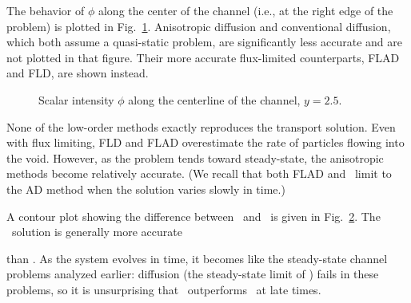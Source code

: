 The behavior of $\phi$ along the center of the channel (i.e., at the
right edge of the problem) is plotted in Fig.~\ref{fig:tdReactor}. Anisotropic
diffusion and conventional diffusion, which both assume a quasi-static problem,
are significantly less accurate and are not plotted in that figure. Their
more accurate flux-limited counterparts, FLAD and FLD, are shown instead.

\begin{figure}[htb]
  \centering\small
  \subfloat[$t=2$]{%
    \hspace{-.25in}%
    }%
  \subfloat[$t=5$]{%
    \hspace{-.25in}%
    }

  \subfloat[$t=10$]{%
    \hspace{-.25in}%
    }%
  \subfloat[$t=15$]{%
    \hspace{-.25in}%
    }

  \caption{Scalar intensity $\phi$ along the centerline of the channel, $y=2.5$.}
  \label{fig:tdReactor}
\end{figure}

None of the low-order methods exactly reproduces the transport solution. Even
with flux
limiting, FLD and FLAD overestimate the rate of particles flowing into the void.
However, as the problem tends toward steady-state, the anisotropic
methods become relatively accurate. (We recall that both FLAD and \APone\ limit
to the AD method when the solution varies slowly in time.)

A contour plot showing the difference between \Pone\ and \APone\ is given in
Fig.~\ref{fig:tdReactorContour}. The \APone\ solution is generally more accurate
%
\begin{figure}[htb]
  \centering%



  \label{fig:tdReactorContour}
\end{figure}
%
than \Pone. As the system evolves in time, it becomes like the steady-state
channel problems analyzed earlier: diffusion (the steady-state limit of \Pone)
fails in these problems, so it is unsurprising that \APone\ outperforms \Pone\
at late times.

